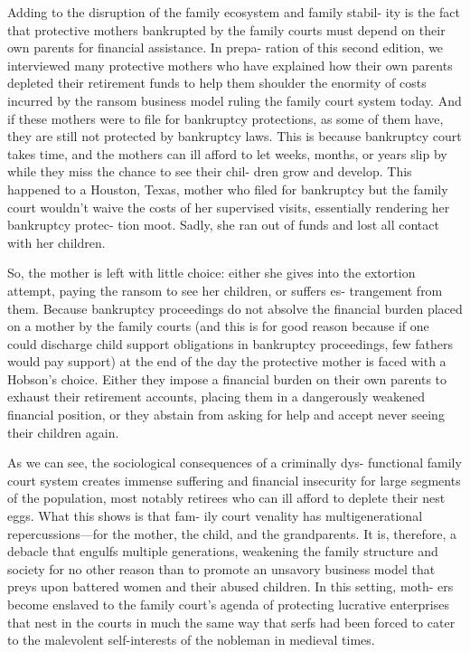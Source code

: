 Adding to the disruption of the family ecosystem and family stabil-
ity is the fact that protective mothers bankrupted by the family courts
must depend on their own parents for financial assistance. In prepa-
ration of this second edition, we interviewed many protective mothers
who have explained how their own parents depleted their retirement
funds to help them shoulder the enormity of costs incurred by the
ransom business model ruling the family court system today. And if
these mothers were to file for bankruptcy protections, as some of them
have, they are still not protected by bankruptcy laws. This is because
bankruptcy court takes time, and the mothers can ill afford to let weeks,
months, or years slip by while they miss the chance to see their chil-
dren grow and develop. This happened to a Houston, Texas, mother
who filed for bankruptcy but the family court wouldn’t waive the costs
of her supervised visits, essentially rendering her bankruptcy protec-
tion moot. Sadly, she ran out of funds and lost all contact with her
children. \pfl{}


So, the mother is left with little choice: either she gives into the
extortion attempt, paying the ransom to see her children, or suffers es-
trangement from them. Because bankruptcy proceedings do not absolve
the financial burden placed on a mother by the family courts (and this is
for good reason because if one could discharge child support obligations
in bankruptcy proceedings, few fathers would pay support) at the end
of the day the protective mother is faced with a Hobson’s choice. Either
they impose a financial burden on their own parents to exhaust their
retirement accounts, placing them in a dangerously weakened financial
position, or they abstain from asking for help and accept never seeing
their children again. \pfl{}


As we can see, the sociological consequences of a criminally dys-
functional family court system creates immense suffering and financial
insecurity for large segments of the population, most notably retirees
who can ill afford to deplete their nest eggs. What this shows is that fam-
ily court venality has multigenerational repercussions—for the mother,
the child, and the grandparents. It is, therefore, a debacle that engulfs
multiple generations, weakening the family structure and society for no
other reason than to promote an unsavory business model that preys
upon battered women and their abused children. In this setting, moth-
ers become enslaved to the family court’s agenda of protecting lucrative
enterprises that nest in the courts in much the same way that serfs had
been forced to cater to the malevolent self-interests of the nobleman in
medieval times. \pfl{}


